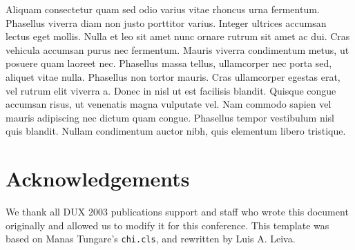 \documentclass{sigchi-ext}
\begin{document}
Aliquam consectetur quam sed odio varius vitae rhoncus urna fermentum. Phasellus viverra diam non justo porttitor varius. Integer ultrices accumsan lectus eget mollis. Nulla et leo sit amet nunc ornare rutrum sit amet ac dui. Cras vehicula accumsan purus nec fermentum. Mauris viverra condimentum metus, ut posuere quam laoreet nec. Phasellus massa tellus, ullamcorper nec porta sed, aliquet vitae nulla. Phasellus non tortor mauris. Cras ullamcorper egestas erat, vel rutrum elit viverra a. Donec in nisl ut est facilisis blandit. Quisque congue accumsan risus, ut venenatis magna vulputate vel. Nam commodo sapien vel mauris adipiscing nec dictum quam congue. Phasellus tempor vestibulum nisl quis blandit. Nullam condimentum auctor nibh, quis elementum libero tristique.



\section{Acknowledgements}
We thank all DUX 2003 publications support and staff who wrote this document originally and allowed us to modify it for this conference.
This template was based on Manas Tungare's \texttt{chi.cls}, and rewritten by Luis A. Leiva.

\balance


\end{document}
